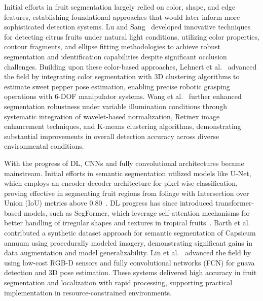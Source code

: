 \documentclass{ieeeaccess}
\begin{document}
Initial efforts in fruit segmentation largely relied on color, shape, and edge features, establishing foundational approaches that would later inform more sophisticated detection systems. Lu and Sang~\cite{lu2015detecting} developed innovative techniques for detecting citrus fruits under natural light conditions, utilizing color properties, contour fragments, and ellipse fitting methodologies to achieve robust segmentation and identification capabilities despite significant occlusion challenges. Building upon these color-based approaches, Lehnert et al.~\cite{lehnert2016sweet} advanced the field by integrating color segmentation with 3D clustering algorithms to estimate sweet pepper pose estimation, enabling precise robotic grasping operations with 6-DOF manipulator systems. Wang et al.~\cite{wang2017robust} further enhanced segmentation robustness under variable illumination conditions through systematic integration of wavelet-based normalization, Retinex image enhancement techniques, and K-means clustering algorithms, demonstrating substantial improvements in overall detection accuracy across diverse environmental conditions.

With the progress of DL, CNNs and fully convolutional architectures became mainstream. Initial efforts in semantic segmentation utilized models like U-Net, which employs an encoder-decoder architecture for pixel-wise classification, proving effective in segmenting fruit regions from foliage with Intersection over Union (IoU) metrics above 0.80~\cite{ronneberger2015u}. DL progress has since introduced transformer-based models, such as SegFormer, which leverage self-attention mechanisms for better handling of irregular shapes and textures in tropical fruits~\cite{xie2021segformer}. 
Barth et al.~\cite{barth2018data} contributed a synthetic dataset approach for semantic segmentation of Capsicum annuum using procedurally modeled imagery, demonstrating significant gains in data augmentation and model generalizability.
Lin et al.~\cite{lin2020color} advanced the field by using low-cost RGB-D sensors and fully convolutional networks (FCN) for guava detection and 3D pose estimation. These systems delivered high accuracy in fruit segmentation and localization with rapid processing, supporting practical implementation in resource-constrained environments.
\end{document}
